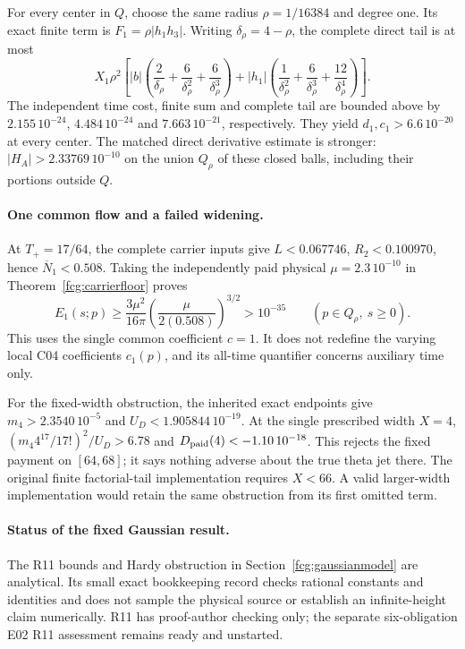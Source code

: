 \documentclass[11pt]{article}
\numberwithin{equation}{section}
\begin{document}
For every center in $Q$, choose the same radius $\rho=1/16384$ and
degree one. Its exact finite term is $F_1=\rho|h_1h_3|$.
Writing $\delta_\rho=4-\rho$, the complete direct tail is at most
\[
 X_1\rho^2\left[
 |b|\left(\frac2{\delta_\rho}+\frac6{\delta_\rho^2}
                           +\frac6{\delta_\rho^3}\right)
 +|h_1|\left(\frac1{\delta_\rho^2}+\frac6{\delta_\rho^3}
                           +\frac{12}{\delta_\rho^4}\right)\right].
\]
The independent time cost, finite sum and complete tail are bounded
above by $2.155\,10^{-24}$, $4.484\,10^{-24}$ and
$7.663\,10^{-21}$, respectively. They yield
$d_1,c_1>6.6\,10^{-20}$ at every center.
The matched direct derivative estimate is stronger:
$|H_A|>2.33769\,10^{-10}$ on the union $Q_\rho$ of these closed
balls, including their portions outside $Q$.

\paragraph{One common flow and a failed widening.}
At $T_+=17/64$, the complete carrier inputs give
$L<0.067746$, $R_2<0.100970$, hence
$\overline N_1<0.508$. Taking the independently paid physical
$\mu=2.3\,10^{-10}$ in Theorem~\ref{fcg:carrierfloor} proves
\[
 E_1(s;p)\ge\frac{3\mu^2}{16\pi}
       \left(\frac{\mu}{2(0.508)}\right)^{3/2}
       >10^{-35}\qquad(p\in Q_\rho,\ s\ge0).
\]
This uses the single common coefficient $c=1$. It does not redefine
the varying local C04 coefficients $c_1(p)$, and its all-time
quantifier concerns auxiliary time only.

For the fixed-width obstruction, the inherited exact endpoints give
$m_4>2.3540\,10^{-5}$ and $U_D<1.905844\,10^{-19}$.
At the single prescribed width $X=4$,
$(m_4 4^{17}/17!)^2/U_D>6.78$ and
$D_{\rm paid}(4)<-1.10\,10^{-18}$.
This rejects the fixed payment on $[64,68]$; it says nothing adverse
about the true theta jet there. The original finite factorial-tail
implementation requires $X<66$. A valid larger-width implementation
would retain the same obstruction from its first omitted term.

\paragraph{Status of the fixed Gaussian result.}
The R11 bounds and Hardy obstruction in
Section~\ref{fcg:gaussianmodel} are analytical. Its small exact
bookkeeping record checks rational constants and identities and does
not sample the physical source or establish an infinite-height claim
numerically. R11 has proof-author checking only; the separate
six-obligation E02 R11 assessment remains ready and unstarted.
\end{document}

